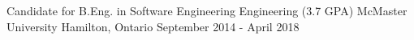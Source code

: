 \begin{cventries}
  \cventry
    {Candidate for B.Eng. in Software Engineering Engineering (3.7 GPA)}
    {McMaster University}
    {Hamilton, Ontario}
    {September 2014 - April 2018}
    {}
\end{cventries}

